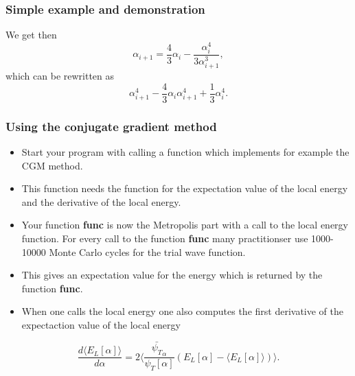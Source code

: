 \documentclass{beamer}
\begin{document}
\begin{frame}
\frametitle{Simple example and demonstration}

\begin{block}{}
We get then
\begin{equation*}
\alpha_{i+1}=\frac{4}{3}\alpha_i-\frac{\alpha_i^4}{3\alpha_{i+1}^3},
\end{equation*}
which can be rewritten as
\begin{equation*}
\alpha_{i+1}^4-\frac{4}{3}\alpha_i\alpha_{i+1}^4+\frac{1}{3}\alpha_i^4.
\end{equation*}
\end{block}
\end{frame}

\begin{frame}
\frametitle{Using the conjugate gradient method}

\begin{block}{}
\begin{itemize}
  \item Start your program with calling a function which implements for example the  CGM method.

  \item This function needs the function for the expectation value of the local energy and the derivative of the local energy.

  \item Your function \textbf{func} is now the Metropolis part with a call to the local energy function. For every call to the function \textbf{func} many practitionser use 1000-10000 Monte Carlo cycles for the trial wave function.

  \item This gives an expectation value for the energy which is returned by the function \textbf{func}.

  \item When one calls the local energy one also computes the first derivative of the expectaction value of the local energy  
\end{itemize}

\noindent
\begin{equation*} \frac{d\langle E_{L}[\alpha] \rangle}{d\alpha}= 2\langle \frac{\bar{\psi_T}_{\alpha}}{\psi_T[\alpha]}\left(E_L[\alpha]-\langle  E_L[\alpha]\rangle\right)\rangle.
\end{equation*}
\end{block}
\end{frame}
\end{document}
